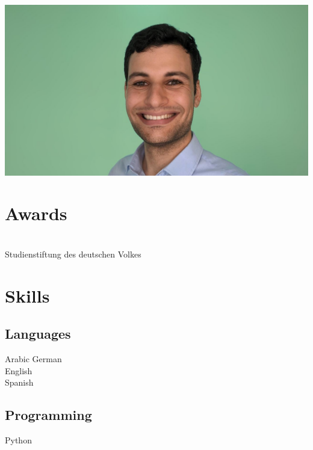 \begin{minipage}[t]{0.27\textwidth} 

\section*{}
\includegraphics[width=0.8\linewidth,trim={12cm 0 8cm 1cm},clip]{icons/Yahya.jpg}
\section{Awards}

 \\
Studienstiftung des deutschen Volkes

\sectionsep

\section{Skills}
\subsection{Languages}
{}
Arabic \textbullet{} German \\
{}
English \\
\sectionsep
{}
Spanish \\

\sectionsep
\subsection{Programming}
{}
Python 


\end{minipage}
